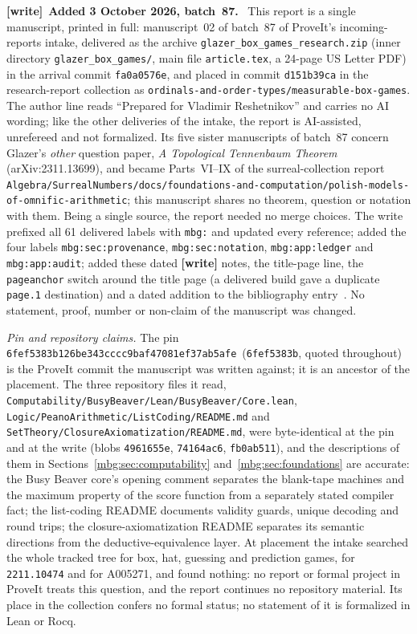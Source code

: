 \documentclass[11pt,letterpaper]{article}
\theoremstyle{definition}
\newcommand{\commit}{\nolinkurl{6fef5383b126be343cccc9baf47081ef37ab5afe}}
\newenvironment{writenote}[1][]{\par\smallskip\begingroup\small
 \noindent\textbf{[write]}\if\relax\detokenize{#1}\relax\else~\textbf{#1.}\fi\ }%
 {\par\endgroup\smallskip}
\begin{document}
\begin{writenote}[Added 3 October 2026, batch~87]
This report is a single manuscript, printed in full: manuscript~02 of batch~87 of ProveIt's incoming-reports intake, delivered as the archive \texttt{glazer\_\allowbreak box\_\allowbreak games\_\allowbreak research.zip} (inner directory \texttt{glazer\_\allowbreak box\_\allowbreak games/}, main file \texttt{article.tex}, a 24-page US Letter PDF) in the arrival commit \texttt{fa0a0576e}, and placed in commit \texttt{d151b39ca} in the research-report collection as \texttt{ordinals-and-order-types/\allowbreak measurable-box-games}. The author line reads ``Prepared for Vladimir Reshetnikov'' and carries no AI wording; like the other deliveries of the intake, the report is AI-assisted, unrefereed and not formalized. Its five sister manuscripts of batch~87 concern Glazer's \emph{other} question paper, \emph{A Topological Tennenbaum Theorem} (arXiv:2311.13699), and became Parts~VI--IX of the surreal-collection report \nolinkurl{Algebra/SurrealNumbers/docs/foundations-and-computation/polish-models-of-omnific-arithmetic}; this manuscript shares no theorem, question or notation with them. Being a single source, the report needed no merge choices. The write prefixed all 61 delivered labels with \texttt{mbg:} and updated every reference; added the four labels \texttt{mbg:sec:provenance}, \texttt{mbg:sec:notation}, \texttt{mbg:app:ledger} and \texttt{mbg:app:audit}; added these dated \textbf{[write]} notes, the title-page line, the \texttt{pageanchor} switch around the title page (a delivered build gave a duplicate \texttt{page.1} destination) and a dated addition to the bibliography entry~\cite{GlazerBox}. No statement, proof, number or non-claim of the manuscript was changed.

\emph{Pin and repository claims.} The pin \commit\ (\texttt{6fef5383b}, quoted throughout) is the ProveIt commit the manuscript was written against; it is an ancestor of the placement. The three repository files it read, \nolinkurl{Computability/BusyBeaver/Lean/BusyBeaver/Core.lean}, \nolinkurl{Logic/PeanoArithmetic/ListCoding/README.md} and \nolinkurl{SetTheory/ClosureAxiomatization/README.md}, were byte-identical at the pin and at the write (blobs \texttt{4961655e}, \texttt{74164ac6}, \texttt{fb0ab511}), and the descriptions of them in Sections~\ref{mbg:sec:computability} and~\ref{mbg:sec:foundations} are accurate: the Busy Beaver core's opening comment separates the blank-tape machines and the maximum property of the score function from a separately stated compiler fact; the list-coding README documents validity guards, unique decoding and round trips; the closure-axiomatization README separates its semantic directions from the deductive-equivalence layer. At placement the intake searched the whole tracked tree for box, hat, guessing and prediction games, for \texttt{2211.10474} and for A005271, and found nothing: no report or formal project in ProveIt treats this question, and the report continues no repository material. Its place in the collection confers no formal status; no statement of it is formalized in Lean or Rocq.


\end{writenote}
\end{document}
